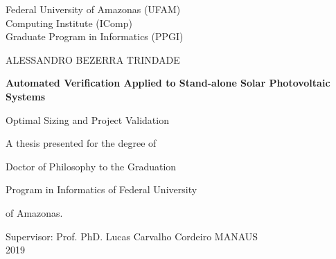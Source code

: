 \begin{titlepage}
    \begin{center}
        \Large
        Federal University of Amazonas (UFAM)\\
        Computing Institute (IComp)\\
		Graduate Program in Informatics (PPGI)\\

        \vspace*{1cm}
        
		\Large
		ALESSANDRO BEZERRA TRINDADE

        \vspace*{2cm}
        		        
        \Huge
        \textbf{Automated Verification Applied to Stand-alone Solar Photovoltaic Systems}
        
        \vspace{0.5cm}
        \LARGE
        Optimal Sizing and Project Validation
        
        \vspace{2cm}
    \end{center}        
    

\hspace{6cm}        A thesis presented for the degree of

\hspace{6cm}        Doctor of Philosophy to the Graduation

\hspace{6cm}        Program in Informatics of Federal University

\hspace{6cm}        of Amazonas.
        
        \vspace{3cm}
        
        \begin{center}
        Supervisor: Prof. PhD. Lucas Carvalho Cordeiro
        \vspace{1cm}
        MANAUS\\
        2019\\

        \end{center}
\end{titlepage}